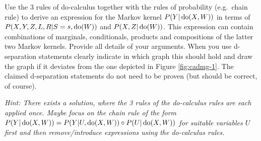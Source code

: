 Use the 3 rules of do-calculus together with the rules of probability (e.g.\ chain rule) to derive an expression for the Markov kernel $P(Y|\operatorname{do}(X,W))$ in terms of $P(X,Y,Z,L,R|S=s,\operatorname{do}(W))$ and $P(X,Z|\operatorname{do}(W))$. This expression can contain combinations of marginals, conditionals, products and compositions of the latter two Markov kernels. 
Provide all details of your arguments.
When you use d-separation statements clearly indicate in which graph this should hold and draw the graph if it deviates from the one depicted in Figure \ref{fig:cadmg-1}.
The claimed d-separation statements do not need to be proven (but should be correct, of course).

\emph{Hint: There exists a solution, where the 3 rules of the do-calculus rules are each applied once. Maybe focus on the chain rule of the form $P(Y|\operatorname{do}(X,W)) = P(Y|U,\operatorname{do}(X,W)) \circ P(U|\operatorname{do}(X,W))$ for suitable variables $U$ first and then remove/introduce expressions using the do-calculus rules.}


